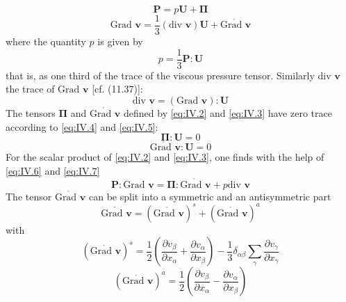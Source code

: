\begin{equation}
\bm{P} = p\bm{U} + \bm{\Pi}
    \label{eq:IV.2}
\end{equation}
\begin{equation}
\textrm{Grad } \bm{v} = \frac{1}{3} (\textrm{div } \bm{v}) \bm{U} + \mathring{\textrm{Grad } \bm{v}}
    \label{eq:IV.3}
\end{equation}
where the quantity $p$ is given by
\begin{equation}
p = \frac{1}{3} \bm{P} : \bm{U}
    \label{eq:IV.4}
\end{equation}
that is, as one third of the trace of the viscous pressure tensor. Similarly div $\bm{v}$ the trace of $\textrm{Grad } \bm{v}$ [cf. (11.37)]:
\begin{equation}
\textrm{div } \bm{v} = (\textrm{Grad } \bm{v}) : \bm{U}
    \label{eq:IV.5}
\end{equation}
The tensors $\bm{\Pi}$ and $\mathring{\textrm{Grad } \bm{v}}$ defined by \eqref{eq:IV.2} and \eqref{eq:IV.3} have zero trace according to \eqref{eq:IV.4} and \eqref{eq:IV.5}:
\begin{equation}
\bm{\Pi} : \bm{U} = 0
    \label{eq:IV.6}
\end{equation}
\begin{equation}
\mathring{\textrm{Grad } \bm{v}} : \bm{U} = 0
    \label{eq:IV.7}
\end{equation}
For the scalar product of \eqref{eq:IV.2} and \eqref{eq:IV.3}, one finds with the help of \eqref{eq:IV.6} and \eqref{eq:IV.7}
\begin{equation}
\bm{P} : \textrm{Grad } \bm{v} = \bm{\Pi} : \mathring{\textrm{Grad } \bm{v}} + p \textrm{div } \bm{v}
    \label{eq:IV.8}
\end{equation}
The tensor $\mathring{\textrm{Grad } \bm{v}}$ can be split into a symmetric and an antisymmetric part
\begin{equation}
\mathring{\textrm{Grad } \bm{v}} = (\mathring{\textrm{Grad } \bm{v}} )^s + (\mathring{\textrm{Grad } \bm{v}} )^a
    \label{eq:IV.9}
\end{equation}
with 
\begin{equation}
(\mathring{\textrm{Grad } \bm{v}} )^s = 
\frac{1}{2} \left( \frac{\partial v_{\beta}}{\partial x_{\alpha}} + \frac{\partial v_{\alpha}}{\partial x_{\beta}} \right)
- 
\frac{1}{3} \delta_{\alpha \beta} \sum_{\gamma} \frac{\partial v_{\gamma}}{\partial x_{\gamma}}
    \label{eq:IV.10}
\end{equation}
\begin{equation}
(\mathring{\textrm{Grad } \bm{v}} )^a = \frac{1}{2} \left( \frac{\partial v_{\beta}}{\partial x_{\alpha}} - \frac{\partial v_{\alpha}}{\partial x_{\beta}} \right)
    \label{eq:IV.11}
\end{equation}

